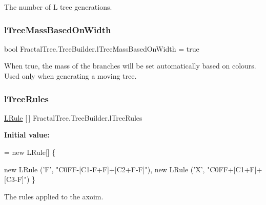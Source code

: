 The number of L tree generations. 

\mbox{\label{class_fractal_tree_1_1_tree_builder_a4ba732b60fd74e4db9f5422a7e9ffd82}} 
\subsubsection{\texorpdfstring{l\+Tree\+Mass\+Based\+On\+Width}{lTreeMassBasedOnWidth}}
{\footnotesize\ttfamily bool Fractal\+Tree.\+Tree\+Builder.\+l\+Tree\+Mass\+Based\+On\+Width = true}



When true, the mass of the branches will be set automatically based on colours. Used only when generating a moving tree. 

\mbox{\label{class_fractal_tree_1_1_tree_builder_a725a1ff0ebe0fbbc78e22eedea80a50e}} 
\subsubsection{\texorpdfstring{l\+Tree\+Rules}{lTreeRules}}
{\footnotesize\ttfamily \hyperlink{class_fractal_tree_1_1_l_rule}{L\+Rule} \mbox{[}$\,$\mbox{]} Fractal\+Tree.\+Tree\+Builder.\+l\+Tree\+Rules}

{\bfseries Initial value\+:}
\begin{DoxyCode}
= \textcolor{keyword}{new} LRule[] \{
            
            
            
            
            

            \textcolor{keyword}{new} LRule (\textcolor{charliteral}{'F'}, \textcolor{stringliteral}{"C0FF-[C1-F+F]+[C2+F-F]"}),
            \textcolor{keyword}{new} LRule (\textcolor{charliteral}{'X'}, \textcolor{stringliteral}{"C0FF+[C1+F]+[C3-F]"})
        \}
\end{DoxyCode}


The rules applied to the axoim. 

